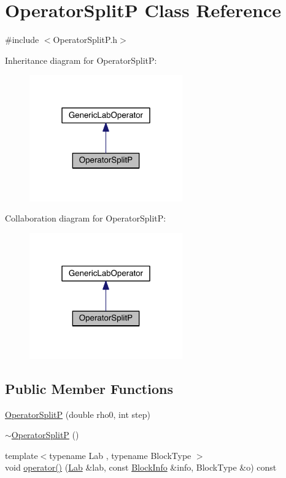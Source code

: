 \hypertarget{class_operator_split_p}{}\section{Operator\+Split\+P Class Reference}
\label{class_operator_split_p}


{\ttfamily \#include $<$Operator\+Split\+P.\+h$>$}



Inheritance diagram for Operator\+Split\+P\+:\nopagebreak
\begin{figure}[H]
\begin{center}
\leavevmode
\includegraphics[width=187pt]{d7/d15/class_operator_split_p__inherit__graph}
\end{center}
\end{figure}


Collaboration diagram for Operator\+Split\+P\+:\nopagebreak
\begin{figure}[H]
\begin{center}
\leavevmode
\includegraphics[width=187pt]{da/d49/class_operator_split_p__coll__graph}
\end{center}
\end{figure}
\subsection*{Public Member Functions}
\begin{DoxyCompactItemize}
\item 
\hyperlink{class_operator_split_p_a6e98b9ffa8fc8b723d165bd8875f4e71}{Operator\+Split\+P} (double rho0, int step)
\item 
\hyperlink{class_operator_split_p_a88289827938a12556d02544d6f2ee1f5}{$\sim$\+Operator\+Split\+P} ()
\item 
{\footnotesize template$<$typename Lab , typename Block\+Type $>$ }\\void \hyperlink{class_operator_split_p_abd37608f5d445bfaf06c9b1f2a31fabf}{operator()} (\hyperlink{_definitions_8h_ae720d9054713370bbf4c86860e4dde70}{Lab} \&lab, const \hyperlink{struct_block_info}{Block\+Info} \&info, Block\+Type \&o) const 
\end{DoxyCompactItemize}
